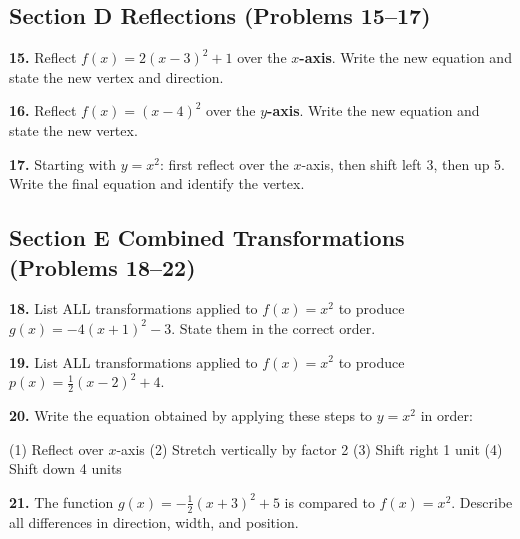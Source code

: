 \documentclass[11pt]{article}
\newcommand{\ws}[1][3cm]{\vspace{#1}}
\begin{document}
\ws[2.5cm]

\subsection*{Section D \quad Reflections (Problems 15--17)}

\textbf{15.} Reflect $f(x) = 2(x - 3)^2 + 1$ over the \textbf{$x$-axis}.
Write the new equation and state the new vertex and direction.

\ws[2.5cm]

\textbf{16.} Reflect $f(x) = (x - 4)^2$ over the \textbf{$y$-axis}.
Write the new equation and state the new vertex.

\ws[2.5cm]

\textbf{17.} Starting with $y = x^2$: first reflect over the $x$-axis, then shift left 3, then up 5.
Write the final equation and identify the vertex.

\ws[3cm]

\subsection*{Section E \quad Combined Transformations (Problems 18--22)}

\textbf{18.} List ALL transformations applied to $f(x) = x^2$ to produce $g(x) = -4(x + 1)^2 - 3$.
State them in the correct order.

\ws[3.5cm]

\textbf{19.} List ALL transformations applied to $f(x) = x^2$ to produce $p(x) = \tfrac{1}{2}(x - 2)^2 + 4$.

\ws[3cm]

\textbf{20.} Write the equation obtained by applying these steps to $y = x^2$ in order:

\hspace{1cm}(1) Reflect over $x$-axis \hspace{1cm} (2) Stretch vertically by factor 2
\hspace{0.5cm}(3) Shift right 1 unit \hspace{0.5cm}(4) Shift down 4 units

\ws[3cm]

\textbf{21.} The function $g(x) = -\tfrac{1}{2}(x + 3)^2 + 5$ is compared to $f(x) = x^2$.
Describe all differences in direction, width, and position.
\end{document}
